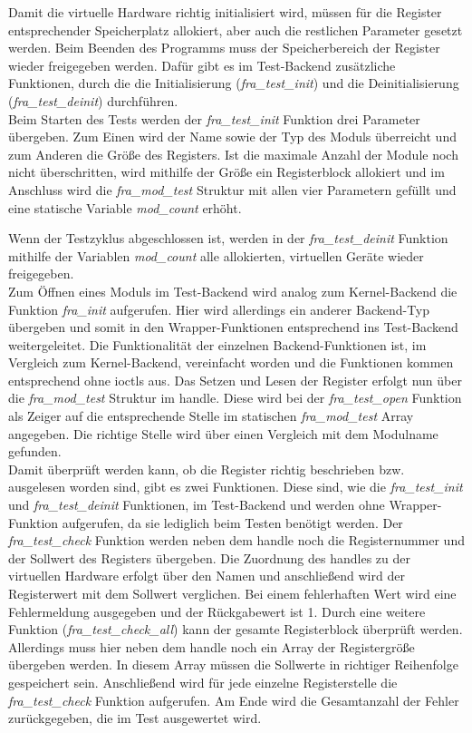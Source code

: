 Damit die virtuelle Hardware richtig initialisiert wird, müssen für die Register entsprechender Speicherplatz allokiert, aber auch die restlichen Parameter gesetzt werden. Beim Beenden des Programms muss der Speicherbereich der Register wieder freigegeben werden. Dafür gibt es im Test-Backend zusätzliche Funktionen, durch die die Initialisierung (\textit{fra\_test\_init}) und die Deinitialisierung (\textit{fra\_test\_deinit}) durchführen.\\

 
Beim Starten des Tests werden der \textit{fra\_test\_init} Funktion drei Parameter übergeben. Zum Einen wird der Name sowie der Typ des Moduls überreicht und zum Anderen die Größe des Registers. Ist die maximale Anzahl der Module noch nicht überschritten, wird mithilfe der Größe ein Registerblock allokiert und im Anschluss wird die \textit{fra\_mod\_test} Struktur mit allen vier Parametern gefüllt und eine statische Variable \textit{mod\_count} erhöht.

Wenn der Testzyklus abgeschlossen ist, werden in der \textit{fra\_test\_deinit} Funktion mithilfe der Variablen \textit{mod\_count} alle allokierten, virtuellen Geräte wieder freigegeben.\\


Zum Öffnen eines Moduls im Test-Backend wird analog zum Kernel-Backend die Funktion \textit{fra\_init} aufgerufen. Hier wird allerdings ein anderer Backend-Typ übergeben und somit in den Wrapper-Funktionen entsprechend ins Test-Backend weitergeleitet. 
Die Funktionalität der einzelnen Backend-Funktionen ist, im Vergleich zum Kernel-Backend, vereinfacht worden und die Funktionen kommen entsprechend ohne \ac{ioctl}s aus. Das Setzen und Lesen der Register erfolgt nun über die \textit{fra\_mod\_test} Struktur im \gls{handle}. Diese wird bei der \textit{fra\_test\_open} Funktion als Zeiger auf die entsprechende Stelle im statischen \textit{fra\_mod\_test} Array angegeben. Die richtige Stelle wird über einen Vergleich mit dem Modulname gefunden.\\



Damit überprüft werden kann, ob die Register richtig beschrieben bzw. ausgelesen worden sind, gibt es zwei Funktionen. Diese sind, wie die \textit{fra\_test\_init} und \textit{fra\_test\_deinit} Funktionen, im Test-Backend und werden ohne Wrapper-Funktion aufgerufen, da sie lediglich beim Testen benötigt werden.
Der \textit{fra\_test\_check} Funktion werden neben dem \gls{handle} noch die Registernummer und der Sollwert des Registers übergeben. Die Zuordnung des \gls{handle}s zu der virtuellen Hardware erfolgt über den Namen und anschließend wird der Registerwert mit dem Sollwert verglichen. Bei einem fehlerhaften Wert wird eine Fehlermeldung ausgegeben und der Rückgabewert ist 1.
Durch eine weitere Funktion (\textit{fra\_test\_check\_all}) kann der gesamte Registerblock überprüft werden. Allerdings muss hier neben dem \gls{handle} noch ein Array der Registergröße übergeben werden. In diesem Array müssen die Sollwerte in richtiger Reihenfolge gespeichert sein. Anschließend wird für jede einzelne Registerstelle die \textit{fra\_test\_check} Funktion aufgerufen. Am Ende wird die Gesamtanzahl der Fehler zurückgegeben, die im Test ausgewertet wird.


